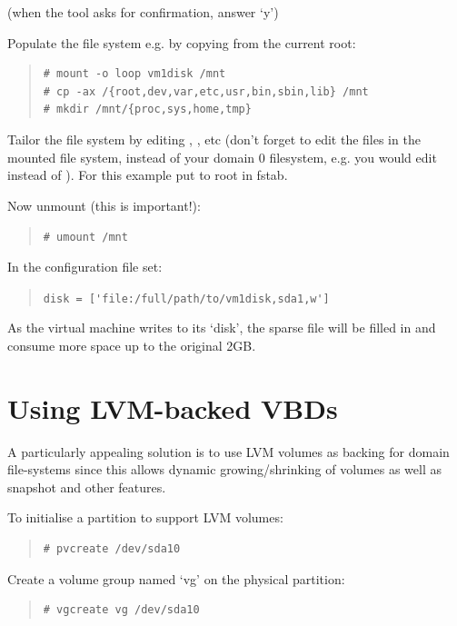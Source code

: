 \documentclass[11pt,twoside,final,openright]{report}
\begin{document}
(when the tool asks for confirmation, answer `y')

Populate the file system e.g. by copying from the current root:
\begin{quote}
\begin{verbatim}
# mount -o loop vm1disk /mnt
# cp -ax /{root,dev,var,etc,usr,bin,sbin,lib} /mnt
# mkdir /mnt/{proc,sys,home,tmp}
\end{verbatim}
\end{quote}

Tailor the file system by editing ,
, etc (don't forget to edit the files in the
mounted file system, instead of your domain 0 filesystem, e.g. you
would edit  instead of  ).  For
this example put  to root in fstab.

Now unmount (this is important!):
\begin{quote}
\verb_# umount /mnt_
\end{quote}

In the configuration file set:
\begin{quote}
\verb_disk = ['file:/full/path/to/vm1disk,sda1,w']_
\end{quote}

As the virtual machine writes to its `disk', the sparse file will be
filled in and consume more space up to the original 2GB.


\section{Using LVM-backed VBDs}

A particularly appealing solution is to use LVM volumes 
as backing for domain file-systems since this allows dynamic
growing/shrinking of volumes as well as snapshot and other 
features. 

To initialise a partition to support LVM volumes:
\begin{quote}
\begin{verbatim} 
# pvcreate /dev/sda10		
\end{verbatim} 
\end{quote}

Create a volume group named `vg' on the physical partition:
\begin{quote}
\begin{verbatim} 
# vgcreate vg /dev/sda10
\end{verbatim} 
\end{quote}
\end{document}
